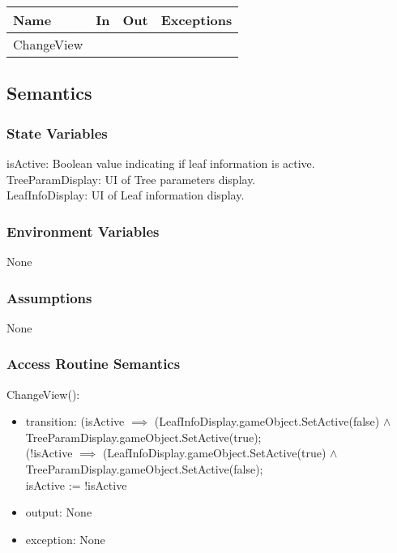 \documentclass[12pt, titlepage]{article}
\begin{document}
\begin{center}
\begin{tabular}{| l | l | l | p{5cm}|}
\hline
\textbf{Name} & \textbf{In} & \textbf{Out} & \textbf{Exceptions} \\
\hline
 ChangeView&  &  &  \\
\hline
\end{tabular}
\end{center}

\subsection{Semantics}

\subsubsection{State Variables}
isActive: Boolean value indicating if leaf information is active. \\
TreeParamDisplay: UI of Tree parameters display.\\
LeafInfoDisplay: UI of Leaf information display.

\subsubsection{Environment Variables}
None
\subsubsection{Assumptions}
None
\subsubsection{Access Routine Semantics}

\noindent ChangeView():
\begin{itemize}
\item transition: (isActive $\implies$ (LeafInfoDisplay.gameObject.SetActive(false) $\land$ TreeParamDisplay.gameObject.SetActive(true);\\

(!isActive $\implies$ (LeafInfoDisplay.gameObject.SetActive(true) $\land$ TreeParamDisplay.gameObject.SetActive(false);\\

isActive := !isActive
\item output: None
\item exception: None
\end{itemize}
\end{document}
